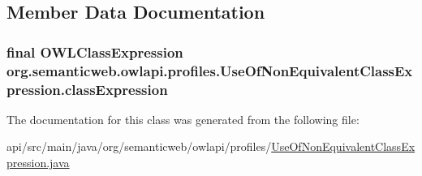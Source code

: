 \subsection{Member Data Documentation}
\hypertarget{classorg_1_1semanticweb_1_1owlapi_1_1profiles_1_1_use_of_non_equivalent_class_expression_ad9113baf025316a69d4c99a670f45de8}{
\subsubsection[{class\-Expression}]{\setlength{\rightskip}{0pt plus 5cm}final {\bf O\-W\-L\-Class\-Expression} org.\-semanticweb.\-owlapi.\-profiles.\-Use\-Of\-Non\-Equivalent\-Class\-Expression.\-class\-Expression\hspace{0.3cm}{\ttfamily [private]}}}\label{classorg_1_1semanticweb_1_1owlapi_1_1profiles_1_1_use_of_non_equivalent_class_expression_ad9113baf025316a69d4c99a670f45de8}


The documentation for this class was generated from the following file\-:\begin{DoxyCompactItemize}
\item 
api/src/main/java/org/semanticweb/owlapi/profiles/\hyperlink{_use_of_non_equivalent_class_expression_8java}{Use\-Of\-Non\-Equivalent\-Class\-Expression.\-java}\end{DoxyCompactItemize}
